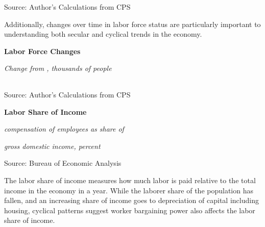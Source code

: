 \documentclass{report}
\makeatletter
\newcommand{\tbllink}[1]{\href{https://raw.githubusercontent.com/bdecon/US-chartbook/master/chartbook/data/#1}{\faTable}}
\newcommand*\short[1]{\expandafter\@gobbletwo\number\numexpr#1\relax}
\newcommand{\shdateaxisticks}{
		date coordinates in=x, axis line style={draw=none},
		xmax={2021-01-01},
		max space between ticks=40,	    
		xtick={{1990-01-01}, {1995-01-01}, {2000-01-01}, 
			{2005-01-01}, {2010-01-01}, {2015-01-01}, {2020-01-01}},
		minor xtick={},
		enlarge y limits={0.06}, enlarge x limits={0.01},
		}
\newcommand{\stdline}[4]{\addplot[very thick, no markers, color=#1] 
		table [x=#2, y=#3, col sep=comma] {#4};	}
\newcommand{\rbars}{
		\fill[color=black!10] (axis cs:{1990-07-01},\pgfkeysvalueof{/pgfplots/ymin}) rectangle 
			(axis cs:{1991-03-01}, \pgfkeysvalueof{/pgfplots/ymax});
		\fill[color=black!10] (axis cs:{2007-12-01},\pgfkeysvalueof{/pgfplots/ymin}) rectangle 
			(axis cs:{2009-07-01}, \pgfkeysvalueof{/pgfplots/ymax});
		\fill[color=black!10] (axis cs:{2001-03-01},\pgfkeysvalueof{/pgfplots/ymin}) rectangle 
			(axis cs:{2001-11-01}, \pgfkeysvalueof{/pgfplots/ymax});
		\fill[color=black!10] (axis cs:{2020-02-01},\pgfkeysvalueof{/pgfplots/ymin}) rectangle 
			(axis cs:{2020-09-01}, \pgfkeysvalueof{/pgfplots/ymax});}
\makeatother
\begin{document}
{{{{{{\begin{minipage}{0.76\textwidth}
\vspace{1mm}	
	
\footnotesize{Source: Author's Calculations from CPS}

\vspace{4mm}

\small Additionally, changes over time in labor force status are particularly important to understanding both secular and cyclical trends in the economy. 

\vspace{3mm}

\noindent \normalsize \textbf{Labor Force Changes}

\footnotesize{\textit{Change from \unskip, thousands of people}}

\noindent {} \setlength{\tabcolsep}{3.0pt} \color{black!90}
		{\renewcommand{\arraystretch}{1.52}
		 \begin{tabular}{p{27.8mm} R{11.2mm} R{10.4mm} R{10.4mm} R{10.2mm} 
		 				 R{10.6mm} R{10.4mm} R{10.4mm}}
			 \hline
		\end{tabular}}
		
		\vspace{1mm}
		
\footnotesize{Source: Author's Calculations from CPS}

\end{minipage}
\newpage

\begin{minipage}{0.325\textwidth}
\normalsize \textbf{Labor Share of Income}

\footnotesize{\textit{compensation of employees as share of}}

\footnotesize{\textit{gross domestic income, percent}}

\hspace*{-2mm} 

\footnotesize{Source: Bureau of Economic Analysis} \hspace{2mm} \tbllink{laborshare.csv}

\end{minipage}\hspace{7mm}
\begin{minipage}{0.38\textwidth}
\small The labor share of income measures how much labor is paid relative to the total income in the economy in a year. While the laborer share of the population has fallen, and an increasing share of income goes to depreciation of capital including housing, cyclical patterns suggest worker bargaining power also affects the labor share of income.  
\end{minipage}

}}}}}}
\end{document}
